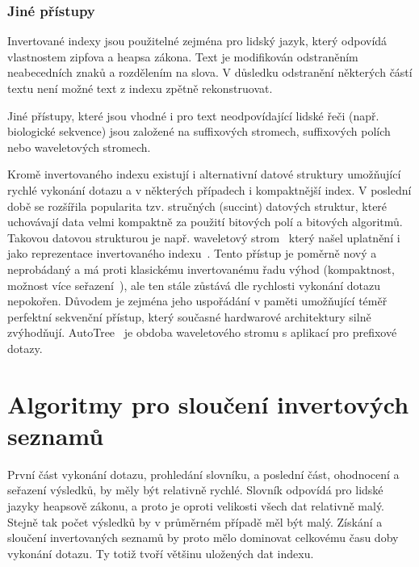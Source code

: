 \documentclass[11pt,letterpaper,oneside,openright]{book}
\begin{document}

\subsubsection{Jiné přístupy}
Invertované indexy jsou použitelné zejména pro lidský jazyk, který odpovídá
vlastnostem zipfova a heapsa zákona. Text je modifikován odstraněním
neabecedních znaků a rozdělením na slova. V důsledku odstranění některých částí
textu není možné text z indexu zpětně rekonstruovat. 

Jiné přístupy, které jsou vhodné i pro text neodpovídající lidské řeči (např.
biologické sekvence) jsou založené na suffixových stromech, suffixových polích
nebo waveletových stromech.


Kromě invertovaného indexu existují i alternativní datové struktury umožňující
rychlé vykonání dotazu a v některých případech i kompaktnější index. V poslední
době se rozšířila popularita tzv. stručných (succint) datových struktur, které
uchovávají data velmi kompaktně za použití bitových polí a bitových algoritmů.
Takovou datovou strukturou je např. waveletový
strom~\cite{Grossi:2003:HET:644108.644250} který našel uplatnění i jako
reprezentace invertovaného
indexu~\cite{Ferragina:2007:CRS:1240233.1240243,FERRAGINA2009849}. Tento
přístup je poměrně nový a neprobádaný a má proti klasickému invertovanému řadu
výhod (kompaktnost, možnost více seřazení~\cite{Navarro2010}), ale ten stále
zůstává dle rychlosti vykonání dotazu nepokořen.  Důvodem je zejména jeho
uspořádání v paměti umožňující téměř perfektní sekvenční přístup, který
současné hardwarové architektury silně zvýhodňují. AutoTree~\cite{Weber2007} je
obdoba waveletového stromu s aplikací pro prefixové dotazy.



\section{Algoritmy pro sloučení invertových seznamů}
První část vykonání dotazu, prohledání slovníku, a poslední část, ohodnocení a
seřazení výsledků, by měly být relativně rychlé. Slovník odpovídá pro lidské
jazyky heapsově zákonu, a proto je oproti velikosti všech dat relativně malý.
Stejně tak počet výsledků by v průměrném případě měl být malý. Získání a
sloučení invertovaných seznamů by proto mělo dominovat celkovému času doby
vykonání dotazu. Ty totiž tvoří většinu uložených dat indexu.
\end{document}
